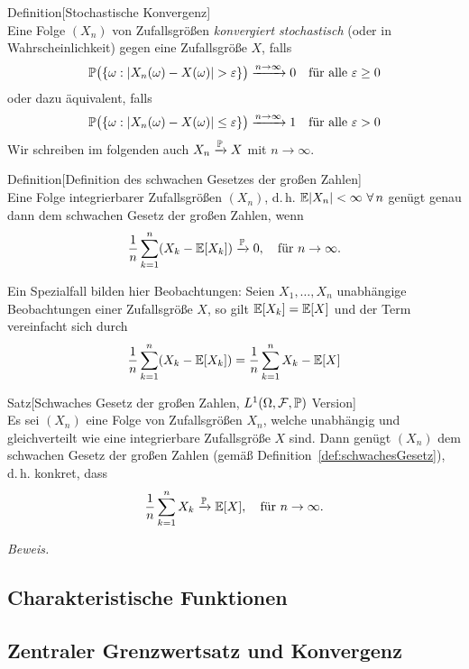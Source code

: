 \begin{colbox}{Definition}[Stochastische Konvergenz]\ \\
    Eine Folge $(X_n)$ von Zufallsgrößen \emph{konvergiert stochastisch} (oder in Wahrscheinlichkeit) gegen eine 
    Zufallsgröße $X$, falls
    \[
    \P\big(\{\omega:|X_n(\omega)-X(\omega)|>\epsilon\}\big) 
    \xrightarrow{n\to\infty} 0\quad\text{für alle }\epsilon \geq 0
    \]
    oder dazu äquivalent, falls
    \[
    \P\big(\{\omega:|X_n(\omega)-X(\omega)|\leq\epsilon\}\big) 
    \xrightarrow{n\to\infty} 1\quad\text{für alle } \epsilon > 0
    \]
    Wir schreiben im folgenden auch $X_n\conP X$ mit $n\to\infty$.
\end{colbox}
\begin{colbox}{Definition}[Definition des schwachen Gesetzes der großen Zahlen]\label{def:schwachesGesetz}\ \\
    Eine Folge integrierbarer Zufallsgrößen $(X_n)$, d.\,h. $\E|X_n|<\infty\ \forall\,n$ genügt genau dann
    dem schwachen Gesetz der großen Zahlen, wenn
    \[
    \frac{1}{n}\sum_{k=1}^{n}(X_k-\E[X_k]) \conP 0,\quad\text{für }n\to\infty.
    \]
\end{colbox}
Ein Spezialfall bilden hier Beobachtungen: Seien $X_1,\dotsc,X_n$ unabhängige Beobachtungen einer Zufallsgröße $X$, 
so gilt $\E[X_k]=\E[X]$ und der Term vereinfacht sich durch
\[
\frac{1}{n}\sum_{k=1}^{n}(X_k-\E[X_k]) = \frac{1}{n}\sum_{k=1}^{n}X_k-\E[X]
\]
\begin{colbox}{Satz}[Schwaches Gesetz der großen Zahlen, $L^1(\Omega,\mathcal{F},\P)$ Version]\ \\
    Es sei $(X_n)$ eine Folge von Zufallsgrößen $X_n$, welche unabhängig und gleichverteilt wie eine integrierbare
    Zufallsgröße $X$ sind. 
    Dann genügt $(X_n)$ dem schwachen Gesetz der großen Zahlen (gemäß Definition~\ref{def:schwachesGesetz}), 
    d.\,h. konkret, dass
    \[
    \frac{1}{n}\sum_{k=1}^{n} X_k \conP \E[X], \quad \text{für } n \to \infty.
    \]
\end{colbox}
\textit{Beweis.}





\subsection{Charakteristische Funktionen}

\subsection{Zentraler Grenzwertsatz und Konvergenz}